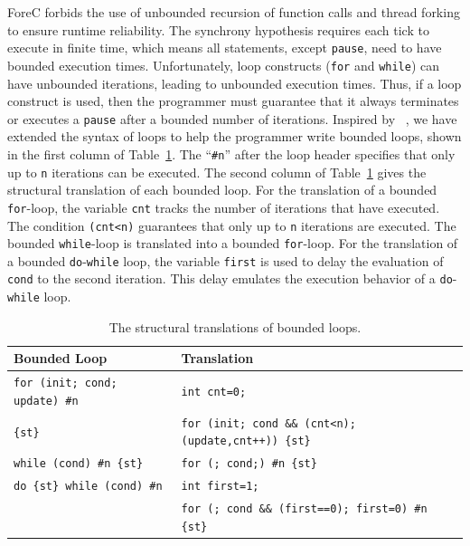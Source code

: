 ForeC forbids the use of unbounded recursion of function calls and 
thread forking to ensure runtime reliability. 
The synchrony hypothesis requires each tick to execute 
in finite time, which means all statements, except \verb$pause$, 
need to have bounded execution times. Unfortunately, loop constructs 
(\verb$for$ and \verb$while$) can have unbounded iterations, leading to
unbounded execution times. Thus, if a loop construct is used, 
then the programmer must guarantee that it always terminates or executes
a \verb$pause$ after a bounded number of iterations. Inspired by \pretc{}~\cite{pret_pretc}, 
we have extended the syntax of loops to help the programmer write 
bounded loops, shown in the first column of Table~\ref{table:forec_loop_translations}. 
The ``\verb$#n$'' after the loop header specifies 
that only up to \verb$n$ iterations can be executed.
The second column of Table~\ref{table:forec_loop_translations}
gives the structural translation of each bounded loop. 
For the translation of a bounded \verb$for$-loop,
the variable \verb$cnt$ tracks the number of iterations that have 
executed. The condition \verb$(cnt<n)$ guarantees that 
only up to \verb$n$ iterations are executed. The bounded 
\verb$while$-loop is translated into a bounded \verb$for$-loop. 
For the translation of a bounded \verb$do$-\verb$while$ loop, 
the variable \verb$first$ is used to delay the evaluation of 
\verb$cond$ to the second iteration. This delay emulates the 
execution behavior of a \verb$do$-\verb$while$ loop. 

\begin{table}
	\centering
	\renewcommand{\arraystretch}{1.25}
	
	\begin{tabular}{| l | l |}
		\hline
		\bf{Bounded Loop}						& \bf{Translation}											\\ 
		\hline
		\verb$for (init; cond; update) #n$		& \verb$int cnt=0;$											\\
		\verb${st}$								& \verb$for (init; cond && (cnt<n); (update,cnt++)) {st}$	\\ \hline
		\verb$while (cond) #n {st}$				& \verb$for (; cond;) #n {st}$								\\ \hline
		\verb$do {st} while (cond) #n$			& \verb$int first=1;$										\\
												& \verb$for (; cond && (first==0); first=0) #n {st}$		\\ \hline
	\end{tabular}
	
	\caption{The structural translations of bounded loops.}
	\label{table:forec_loop_translations}
\end{table}
